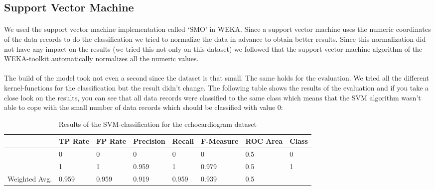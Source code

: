 \documentclass[paper=a4, fontsize=11pt]{scrartcl} %
\numberwithin{equation}{section} %
\numberwithin{figure}{section} %
\numberwithin{table}{section} %
\begin{document}
\subsection{Support Vector Machine}

\paragraph{}We used the support vector machine implementation called `SMO' in WEKA. Since a support vector machine uses the numeric coordinates of the data records to do the classification we tried to normalize the data in advance to obtain better results. Since this normalization did not have any impact on the results (we tried this not only on this dataset) we followed that the support vector machine algorithm of the WEKA-toolkit automatically normalizes all the numeric values.

\paragraph{}The build of the model took not even a second since the dataset is that small. The same holds for the evaluation. We tried all the different kernel-functions for the classification but the result didn't change. The following table shows the results of the evaluation and if you take a close look on the results, you can see that all data records were classified to the same class which means that the SVM algorithm wasn't able to cope with the small number of data records which should be classified with value 0:

\begin{table}[h]
\centering
\begin{tabular}{|llllllll|}
	\hline
									&TP Rate   	&FP Rate   &Precision   &Recall  &F-Measure   &ROC Area  &Class\\
	\hline
									&0         	&0         &0         	&0       &  0         & 0.5      &0\\
  								&1         	&1         &0.959     	&1       &0.979       &	0.5      &1\\
  \hline
	Weighted Avg.		&0.959     	&0.959     &0.919   		&0.959   &0.939     	&0.5	&\\
	\hline
\end{tabular}
\caption{Results of the SVM-classification for the echocardiogram dataset}
\end{table}

\vspace{6pt}
\end{document}
